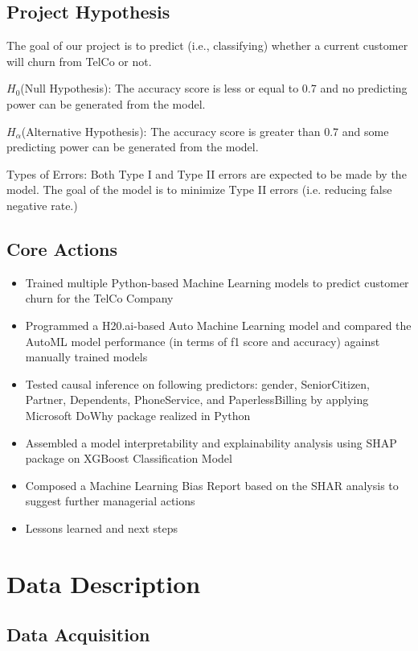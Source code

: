 \documentclass[12pt]{article}
\begin{document}
\subsection{Project Hypothesis}
The goal of our project is to predict (i.e., classifying) whether a current customer will churn from TelCo or not.

$H_0$(Null Hypothesis): The accuracy score is less or equal to 0.7 and no predicting power can be generated from the model. 

$H_\alpha$(Alternative Hypothesis): The accuracy score is greater than 0.7 and some predicting power can be generated from the model.

Types of Errors: Both Type I and Type II errors are expected to be made by the model. The goal of the model is to minimize Type II errors (i.e. reducing false negative rate.)    

\subsection{Core Actions}
\begin{itemize}
	\item Trained multiple Python-based Machine Learning models to predict customer churn for the TelCo Company
	\item Programmed a H20.ai-based Auto Machine Learning model and compared the AutoML model performance (in terms of f1 score and accuracy) against manually trained models
	\item Tested causal inference on following predictors: gender, SeniorCitizen, Partner, Dependents, PhoneService, and PaperlessBilling by applying Microsoft DoWhy package realized in Python
	\item Assembled a model interpretability and explainability analysis using SHAP package on XGBoost Classification Model
	\item Composed a Machine Learning Bias Report based on the SHAR analysis to suggest further managerial actions
	\item Lessons learned and next steps

\end{itemize}

\section{Data Description} \label{sec:DataDescription}

\subsection{Data Acquisition}
\end{document}
